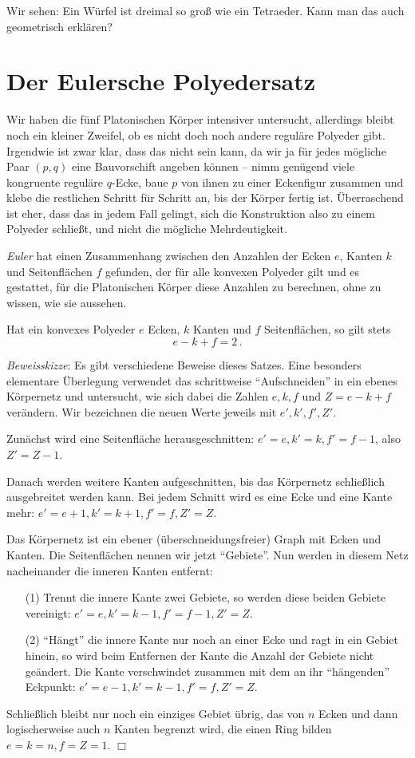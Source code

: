 \documentclass[11pt]{article}
\begin{document}
Wir sehen: Ein Würfel ist dreimal so groß wie ein Tetraeder.  Kann man das
auch geometrisch erklären? 

\section*{Der Eulersche Polyedersatz}

Wir haben die fünf Platonischen Körper intensiver untersucht, allerdings
bleibt noch ein kleiner Zweifel, ob es nicht doch noch andere reguläre
Polyeder gibt.  Irgendwie ist zwar klar, dass das nicht sein kann, da wir ja
für jedes mögliche Paar $(p,q)$ eine Bauvorschift angeben können -- nimm
genügend viele kongruente reguläre $q$-Ecke, baue $p$ von ihnen zu einer
Eckenfigur zusammen und klebe die restlichen Schritt für Schritt an, bis der
Körper fertig ist.  Überraschend ist eher, dass das in jedem Fall gelingt,
sich die Konstruktion also zu einem Polyeder schließt, und nicht die mögliche
Mehrdeutigkeit. 

\emph{Euler} hat einen Zusammenhang zwischen den Anzahlen der Ecken $e$,
Kanten $k$ und Seitenflächen $f$ gefunden, der für alle konvexen Polyeder gilt
und es gestattet, für die Platonischen Körper diese Anzahlen zu berechnen,
ohne zu wissen, wie sie aussehen.

\begin{satz}
Hat ein konvexes Polyeder $e$ Ecken, $k$ Kanten und $f$ Seitenflächen,
so gilt stets \[e-k+f=2\,.\]
\end{satz}

\emph{Beweisskizze}: Es gibt verschiedene Beweise dieses Satzes. Eine
besonders elementare Über\-legung verwendet das schrittweise
``Aufschneiden'' in ein ebenes Körpernetz und untersucht, wie sich
dabei die Zahlen $e,k,f$ und $Z=e-k+f$ verändern. Wir bezeichnen die
neuen Werte jeweils mit $e',k',f',Z'$.

Zunächst wird eine Seitenfläche herausgeschnitten: $e'=e, k'=k,
f'=f-1$, also $Z'=Z-1$.

Danach werden weitere Kanten aufgeschnitten, bis das Körpernetz
schließlich ausgebreitet werden kann. Bei jedem Schnitt wird es eine
Ecke und eine Kante mehr: $e'=e+1, k'=k+1, f'=f, Z'=Z$.

Das Körpernetz ist ein ebener (überschneidungsfreier) Graph mit Ecken
und Kanten. Die Seitenflächen nennen wir jetzt ``Gebiete''.  Nun
werden in diesem Netz nacheinander die inneren Kanten entfernt:
\begin{itemize}
\item[(1)] Trennt die innere Kante zwei Gebiete, so werden diese beiden
  Gebiete vereinigt: $e'=e, k'=k-1, f'=f-1, Z'=Z$.
\item [(2)] ``Hängt'' die innere Kante nur noch an einer Ecke und ragt
  in ein Gebiet hinein, so wird beim Entfernen der Kante die Anzahl
  der Gebiete nicht geändert. Die Kante verschwindet zusammen mit dem
  an ihr ``hängenden'' Eckpunkt: $e'=e-1,k'=k-1,f'=f, Z'=Z$.
\end{itemize}
Schließlich bleibt nur noch ein einziges Gebiet übrig, das von $n$
Ecken und dann logischerweise auch $n$ Kanten begrenzt wird, die einen
Ring bilden $e=k=n, f=Z=1$. $\Box$\medskip
\end{document}
